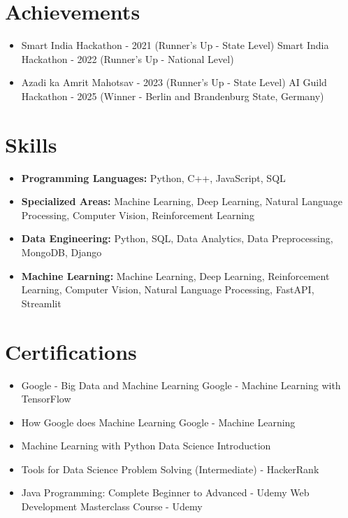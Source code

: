 \documentclass[a4paper,10pt]{article}
\begin{document}
\section*{Achievements}
\begin{itemize}
\item Smart India Hackathon - 2021 (Runner's Up - State Level) \hfill Smart India Hackathon - 2022 (Runner's Up - National Level)
\item Azadi ka Amrit Mahotsav - 2023 (Runner's Up - State Level) \hfill AI Guild Hackathon - 2025 (Winner - Berlin and Brandenburg State, Germany)
\end{itemize}

\section*{Skills}
\begin{itemize}
  \item \textbf{Programming Languages:} Python, C++, JavaScript, SQL
  \item \textbf{Specialized Areas:} Machine Learning, Deep Learning, Natural Language Processing, Computer Vision, Reinforcement Learning
  \item \textbf{Data Engineering:} Python, SQL, Data Analytics, Data Preprocessing, MongoDB, Django
  \item \textbf{Machine Learning:} Machine Learning, Deep Learning, Reinforcement Learning, Computer Vision, Natural Language Processing, FastAPI, Streamlit
\end{itemize}

\section*{Certifications}
\begin{itemize}
\item Google - Big Data and Machine Learning \hfill Google - Machine Learning with TensorFlow
\item How Google does Machine Learning \hfill Google - Machine Learning
\item Machine Learning with Python \hfill Data Science Introduction
\item Tools for Data Science \hfill Problem Solving (Intermediate) - HackerRank
\item Java Programming: Complete Beginner to Advanced - Udemy \hfill Web Development Masterclass Course - Udemy
\end{itemize}
\end{document}
